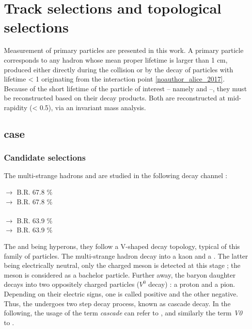 \newpage
\section{Track selections and topological selections}
\label{sec:Section04}


Measurement of primary particles are presented in this work. A primary particle corresponds to any hadron whose mean proper lifetime is larger than 1 cm, produced either directly during the collision or by the decay of particles with lifetime \cTau < 1 \cm originating from the interaction point \ref{noauthor_alice_2017}. Because of the short lifetime of the particle of interest -- namely \rmOmega and \rmPhiMes --, they must be reconstructed based on their decay products. Both are reconstructed at mid-rapidity (\absrap < 0.5), via an invariant mass analysis.

\subsection{\rmOmega case}
\label{sec:Section04.a-}

\subsubsection{Candidate selections}

The multi-strange hadrons \rmOmegaM and \rmAomegaP are studied in the following decay channel :

\rmOmegaM [$sss$] $\rightarrow$ \rmLambda [$u d s$] \Kminus [$\bar{d} s$]  \qquad \textsc{B.R. 67.8 \%}\\
 $\rightarrow$  \Kplus [$u\bar{s}$] \qquad \textsc{B.R. 67.8 \%} \\
\\
\rmLambda [$u d s$] $\rightarrow$ \proton [$uud$] \piMinus [$\bar{u} d$] \qquad \textsc{B.R. 63.9 \%}\\
 $\rightarrow$  \piPlus [$u \bar{d}$] \qquad \textsc{B.R. 63.9 \%}

The \rmLambda and \rmOmega being hyperons, they follow a V-shaped decay topology, typical of this family of particles. The multi-strange hadron decay into a kaon and a \rmLambda. The latter being electrically neutral, only the charged meson is detected at this stage ; the meson is considered as a bachelor particle. Further away, the baryon daughter decays into two oppositely charged particles ($V^0$ decay) : a proton and a pion. Depending on their electric signs, one is called positive and the other negative. Thus, the \rmOmega undergoes two step decay process, known as cascade decay. In the following, the usage of the term \textit{cascade} can refer to \rmOmega, and similarly the term \textit{V0} to \rmLambda.

